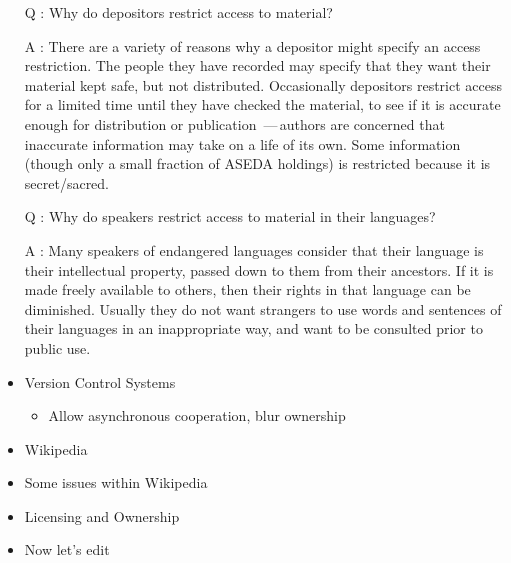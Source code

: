 \documentclass[a4paper,landscape,headrule,footrule,xetex]{foils}
\begin{document}
\begin{itemize}
\item [Q]: Why do depositors restrict access to material?
\item [A]: There are a variety of reasons why a depositor might
  specify an access restriction.  The people they have recorded may
  specify that they want their material kept safe, but not
  distributed.  Occasionally depositors restrict access for a limited
  time until they have checked the material, to see if it is accurate
  enough for distribution or publication \,—\,authors are concerned that inaccurate information may take on a life of its own.  Some information (though only a small fraction of ASEDA holdings) is restricted because it is secret/sacred.
\newpage
\item [Q]: Why do speakers restrict access to material in their languages?
\item [A]: Many speakers of endangered languages consider that their language is their intellectual property, passed down to them from their ancestors.  If it is made freely available to others, then their rights in that language can be diminished.  Usually they do not want strangers to use words and sentences of their languages in an inappropriate way, and want to be consulted prior to public use. 
\end{itemize}


\MyLogo{}
\begin{itemize}
\item Version Control Systems
  \begin{itemize}
  \item Allow asynchronous cooperation, blur ownership
  \end{itemize}
\item Wikipedia
\item Some issues within Wikipedia
\item Licensing and Ownership 
\end{itemize}



\begin{itemize}
\item Now let's edit
\end{itemize}
\end{document}
